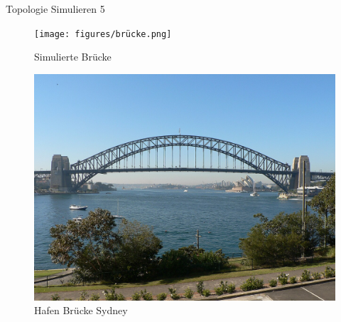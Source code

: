 \documentclass{beamer}
\begin{document}
\begin{frame}{Topologie Simulieren 5}
\begin{figure}[H]
    \begin{minipage}{0.4\textwidth}
        \centering
        \texttt{[image: figures/brücke.png]}
        \caption{Simulierte Br\"ucke}
    \end{minipage}\hfill
    \begin{minipage}{0.4\textwidth}
        \centering
        \includegraphics[width=\linewidth]{figures/Sydney-Harbour_bridge.JPG}
        \caption{Hafen Br\"ucke Sydney\parencite{rabich2023}}
    \end{minipage}
\end{figure}
\end{frame}
\end{document}
